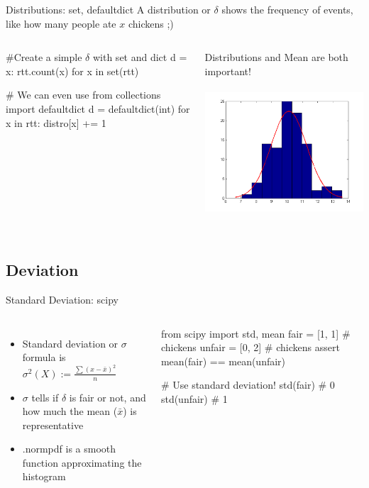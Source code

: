 \begin{pyframe}{Distributions: set, defaultdict}
A distribution or $\delta$ shows the frequency of events, like 
how many people ate $x$ chickens ;)
\begin{columns}
\begin{pycode}
#Create a simple $\delta$ with set and dict 
d = {x: rtt.count(x) for x in set(rtt)}

# We can even use
from collections import defaultdict
d = defaultdict(int)
for x in rtt:
    distro[x] += 1
    


\end{pycode}
\footnotesize
Distributions and Mean are both important!
\includegraphics[height=5.5cm, width=7cm]{histo_gauss.pdf}
\end{columns}
\end{pyframe}

\subsection{Deviation}
\begin{pyframe}{Standard Deviation: scipy}
\begin{columns}

\begin{itemize}
\item Standard deviation or $\sigma$ formula is {\large  $\sigma^{2}(X) := \frac{ \sum(x-\bar{x})^{2} }{n} $ }
\item $\sigma$ tells if $\delta$ is fair or not, and how much the mean ($\bar{x}$) is representative
\item {}.normpdf is a smooth function approximating the histogram
\end{itemize}

\begin{pycode}
from scipy import std, mean
fair = [1, 1] # chickens
unfair = [0, 2] # chickens
assert mean(fair) == mean(unfair)

# Use standard deviation!
std(fair) # 0
std(unfair) # 1

\end{pycode}
\end{columns}
\end{pyframe}


